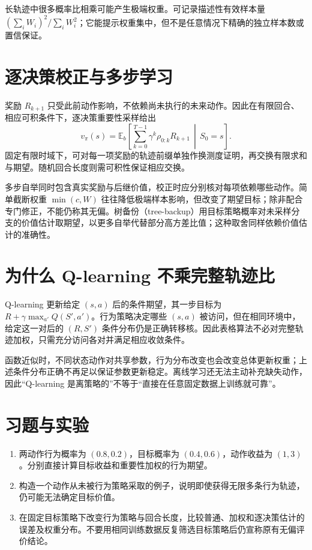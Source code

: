 长轨迹中很多概率比相乘可能产生极端权重。可记录描述性有效样本量 $(\sum_iW_i)^2/\sum_iW_i^2$；它能提示权重集中，但不是任意情况下精确的独立样本数或置信保证。

\section{逐决策校正与多步学习}

奖励 $R_{k+1}$ 只受此前动作影响，不依赖尚未执行的未来动作。因此在有限回合、相应可积条件下，逐决策重要性采样给出
\[
v_\pi(s)=\mathbb E_b\!\left[\sum_{k=0}^{T-1}\gamma^k\rho_{0:k}R_{k+1}\,\middle|\,S_0=s\right].
\]
固定有限时域下，可对每一项奖励的轨迹前缀单独作换测度证明，再交换有限求和与期望。随机回合长度则需可积性保证相应交换。

多步自举同时包含真实奖励与后继价值，校正时应分别核对每项依赖哪些动作。简单截断权重 $\min(c,W)$ 往往降低极端样本影响，但改变了期望目标；除非配合专门修正，不能仍称其无偏。树备份（tree-backup）用目标策略概率对未采样分支的价值估计取期望，以更多自举代替部分高方差比值；这种取舍同样依赖价值估计的准确性。

\section{为什么 Q-learning 不乘完整轨迹比}

Q-learning 更新给定 $(s,a)$ 后的条件期望，其一步目标为 $R+\gamma\max_{a'}Q(S',a')$。行为策略决定哪些 $(s,a)$ 被访问，但在相同环境中，给定这一对后的 $(R,S')$ 条件分布仍是正确转移核。因此表格算法不必对完整轨迹加权，只需充分访问各对并满足相应收敛条件。

函数近似时，不同状态动作对共享参数，行为分布改变也会改变总体更新权重；上述条件分布正确不再足以保证参数更新稳定。离线学习还无法主动补充缺失动作，因此“Q-learning 是离策略的”不等于“直接在任意固定数据上训练就可靠”。

\section{习题与实验}
\begin{enumerate}
\item 两动作行为概率为 $(0.8,0.2)$，目标概率为 $(0.4,0.6)$，动作收益为 $(1,3)$。分别直接计算目标收益和重要性加权的行为期望。
\item 构造一个动作从未被行为策略采取的例子，说明即使获得无限多条行为轨迹，仍可能无法确定目标价值。
\item 在固定目标策略下改变行为策略与回合长度，比较普通、加权和逐决策估计的误差及权重分布。不要用相同训练数据反复筛选目标策略后仍宣称原有无偏评价结论。
\end{enumerate}





